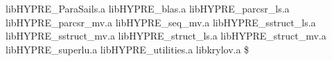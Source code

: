 \begin{ttfamily}
\begin{mdseries}
libHYPRE\_ParaSails.a\linebreak
libHYPRE\_blas.a\linebreak
libHYPRE\_parcsr\_ls.a\linebreak
libHYPRE\_parcsr\_mv.a\linebreak
libHYPRE\_seq\_mv.a\linebreak
libHYPRE\_sstruct\_ls.a\linebreak
libHYPRE\_sstruct\_mv.a\linebreak
libHYPRE\_struct\_ls.a\linebreak
libHYPRE\_struct\_mv.a\linebreak
libHYPRE\_superlu.a\linebreak
libHYPRE\_utilities.a\linebreak
libkrylov.a\linebreak
\$ \linebreak
\end{mdseries}
\end{ttfamily}
